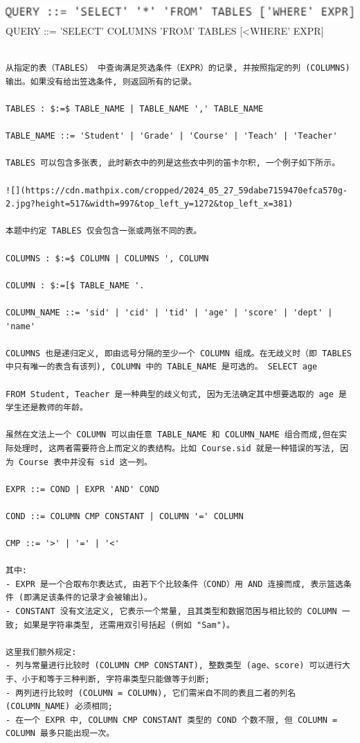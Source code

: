 \documentclass[10pt]{article}
\begin{document}
\includegraphics[max width=\textwidth, center]{2024_05_27_59dabe7159470efca570g-2}\\
QUERY ::= 'SELECT' COLUMNS 'FROM' TABLES [<WHERE' EXPR]

\begin{verbatim}

从指定的表（TABLES） 中查询满足䇜选条件（EXPR）的记录, 并按照指定的列 (COLUMNS) 输出。如果没有给出笠选条件, 则返回所有的记录。

TABLES : $:=$ TABLE_NAME | TABLE_NAME ',' TABLE_NAME

TABLE_NAME ::= 'Student' | 'Grade' | 'Course' | 'Teach' | 'Teacher'

TABLES 可以包含多张表, 此时新衣中的列是这些衣中列的笛卡尔积, 一个例子如下所示。

![](https://cdn.mathpix.com/cropped/2024_05_27_59dabe7159470efca570g-2.jpg?height=517&width=997&top_left_y=1272&top_left_x=381)

本题中约定 TABLES 仅会包含一张或两张不同的表。

COLUMNS : $:=$ COLUMN | COLUMNS ', COLUMN

COLUMN : $:=[$ TABLE_NAME '.

COLUMN_NAME ::= 'sid' | 'cid' | 'tid' | 'age' | 'score' | 'dept' | 'name'

COLUMNS 也是递归定义, 即由远号分隔的至少一个 COLUMN 组成。在无歧义时（即 TABLES 中只有唯一的表含有该列), COLUMN 中的 TABLE_NAME 是可选的。 SELECT age

FROM Student, Teacher 是一种典型的歧义句式, 因为无法确定其中想要选取的 age 是学生还是教师的年龄。

虽然在文法上一个 COLUMN 可以由任意 TABLE_NAME 和 COLUMN_NAME 组合而成,但在实际处理时, 这两者需要符合上而定义的表结构。比如 Course.sid 就是一种错误的写法, 因为 Course 表中并没有 sid 这一列。

EXPR ::= COND | EXPR 'AND' COND

COND ::= COLUMN CMP CONSTANT | COLUMN '=' COLUMN

CMP ::= '>' | '=' | '<'

其中:
- EXPR 是一个合取布尔表达式, 由若下个比较条件（COND）用 AND 连接而成, 表示篮选条件 (即满足该条件的记录才会被输出)。
- CONSTANT 没有文法定义, 它表示一个常量, 且其类型和数据范困与相比较的 COLUMN 一致; 如果是字符串类型, 还需用双引号括起 (例如 "Sam")。

这里我们额外规定:
- 列与常量进行比较时 (COLUMN CMP CONSTANT), 整数类型 (age、score) 可以进行大于、小于和等于三种判断, 字符串类型只能做等于灲断;
- 两列进行比较时 (COLUMN = COLUMN), 它们需米自不同的表且二者的列名 (COLUMN_NAME) 必须相同;
- 在一个 EXPR 中, COLUMN CMP CONSTANT 类型的 COND 个数不限, 但 COLUMN = COLUMN 最多只能出现一次。


\end{verbatim}
\end{document}
